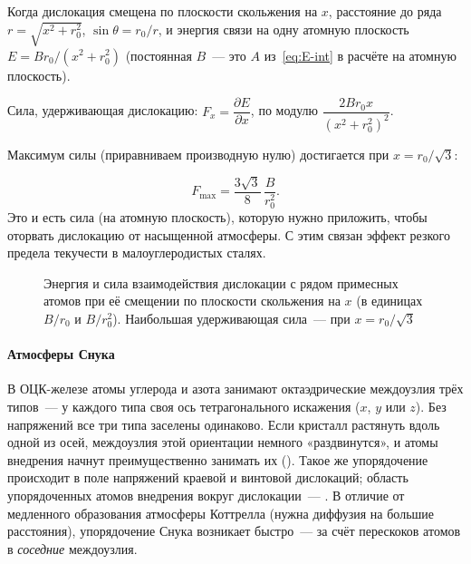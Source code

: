 \begin{shagi}
\item Когда дислокация смещена по плоскости скольжения на $x$,
расстояние до ряда $r=\sqrt{x^2+r_0^2}$, $\sin\theta=r_0/r$, и энергия
связи на одну атомную плоскость $E=Br_0/(x^2+r_0^2)$ (постоянная $B$~—
это $A$ из~\eqref{eq:E-int} в расчёте на атомную плоскость).
\item Сила, удерживающая дислокацию: $F_x=\dfrac{\partial E}{\partial x}$,
по модулю $\dfrac{2Br_0x}{(x^2+r_0^2)^2}$.
\item Максимум силы (приравниваем производную нулю) достигается при
$x=r_0/\sqrt3$:
\end{shagi}
\begin{equation}\label{eq:Fmax-unpin}
F_{\max}=\frac{3\sqrt3}{8}\,\frac{B}{r_0^2}.
\end{equation}
Это и есть сила (на атомную плоскость), которую нужно приложить, чтобы
оторвать дислокацию от насыщенной атмосферы. С этим связан эффект резкого
предела текучести в малоуглеродистых сталях.

\begin{figure}[ht]
\centering
{}
\caption{Энергия и сила взаимодействия дислокации с рядом примесных атомов
при её смещении по плоскости скольжения на $x$ (в единицах $B/r_0$ и
$B/r_0^2$). Наибольшая удерживающая сила~— при $x=r_0/\sqrt3$}
\label{fig:unpin}
\end{figure}

\paragraph{Атмосферы Снука}
В ОЦК-железе атомы углерода и азота занимают октаэдрические междоузлия
трёх типов~— у каждого типа своя ось тетрагонального искажения ($x$,
$y$ или $z$). Без напряжений все три типа заселены одинаково. Если
кристалл растянуть вдоль одной из осей, междоузлия этой ориентации
немного «раздвинутся», и атомы внедрения начнут преимущественно занимать
их (). Такое же упорядочение происходит в поле
напряжений краевой и винтовой дислокаций; область упорядоченных атомов
внедрения вокруг дислокации~— . В отличие от
медленного образования атмосферы Коттрелла (нужна диффузия на большие
расстояния), упорядочение Снука возникает быстро~— за счёт перескоков
атомов в \emph{соседние} междоузлия.

